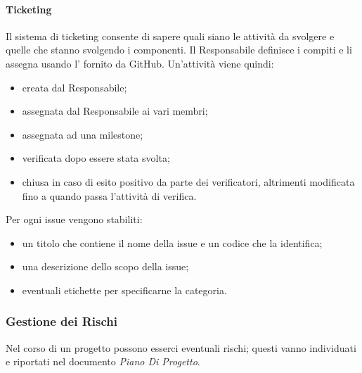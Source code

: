 \paragraph{Ticketing} \hfill \break
Il sistema di ticketing consente di sapere quali siano le attività da svolgere e quelle che stanno svolgendo i 
componenti. Il Responsabile definisce i compiti e li assegna usando l' fornito 
da GitHub. Un'attività viene quindi:
\begin{itemize}
    \item creata dal Responsabile;
    \item assegnata dal Responsabile ai vari membri;
    \item assegnata ad una milestone;
    \item verificata dopo essere stata svolta;
    \item chiusa in caso di esito positivo da parte dei verificatori, altrimenti modificata fino a quando passa l'attività di verifica. 
\end{itemize}
Per ogni issue vengono stabiliti:
\begin{itemize}
    \item un titolo che contiene il nome della issue e un codice che la identifica;
    \item una descrizione dello scopo della issue;
    \item eventuali etichette per specificarne la categoria.
\end{itemize}

\subsubsection{Gestione dei Rischi}
Nel corso di un progetto possono esserci eventuali rischi; questi vanno individuati e riportati nel documento 
\emph{Piano Di Progetto}.


